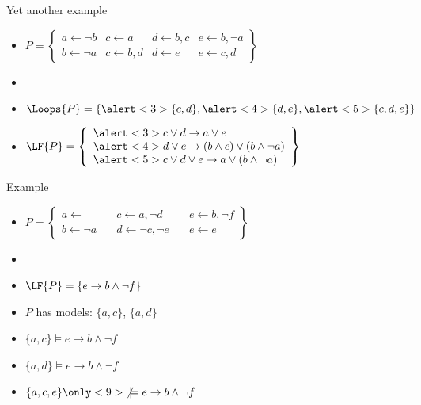 \begin{frame}{Yet another example}
  \bigskip
  \begin{itemize}
  \item<1->
    \(
    P
    =
    \left\{
      \begin{array}{llll}
        a\leftarrow \neg b
      & c\leftarrow a
      & d\leftarrow b,c
      & e\leftarrow b,\neg a
      \\
        b\leftarrow \neg a
      & c\leftarrow b,d
      & d\leftarrow e
      & e\leftarrow c,d
      \end{array}
    \right\}
    \)
    \bigskip
  \item<1-> []
    \begin{center}
      
    \end{center}
  \item<1-> $\Loops{P}=\{\alert<3>{\{c,d\}},\alert<4>{\{d,e\}},\alert<5>{\{c,d,e\}}\}$
    \medskip
  \item<2->
    \(
    \LF{P}
    =
    \left\{
      \begin{array}[c]{l}
        \alert<3>{c\vee d\rightarrow a\vee e}\\
        \alert<4>{d\vee e\rightarrow (b\wedge c)\vee (b\wedge\neg a)}\\
        \alert<5>{c\vee d\vee e\rightarrow a \vee (b\wedge\neg a)}
      \end{array}
    \right\}
    \)
  \end{itemize}
\end{frame}
\begin{frame}{Example}
  \bigskip
  \begin{itemize}
  \item<1->
    \(
    P
    =
    \left\{
      \begin{array}{lll}
        a \leftarrow                 \quad &
        c \leftarrow a, \neg d       \quad &
        e \leftarrow b, \neg f
        \\
        b \leftarrow \neg a         \quad &
        d \leftarrow \neg c, \neg e \quad &
        e \leftarrow e
      \end{array}
    \right\}
    \)
    \bigskip
  \item<1-> []
    \begin{center}
      
    \end{center}
  \item<1-> $\LF{P}=\{e\rightarrow b\wedge\neg f\}$
  \item<2-> $P$ has  models:
    \alert<4-5>{$\{a,c\}$}, \alert<6-7>{$\{a,d\}$}
    \smallskip
  \item<only@4-5> $\{a,c\}                \models e\rightarrow b\wedge\neg f$ \ 
  \item<only@6-7> $\{a,d\}                \models e\rightarrow b\wedge\neg f$ \ 
  \item<only@8->  $\{a,c,e\}\only<9>{\not}\models e\rightarrow b\wedge\neg f$ \ 
  \end{itemize}
\end{frame}
